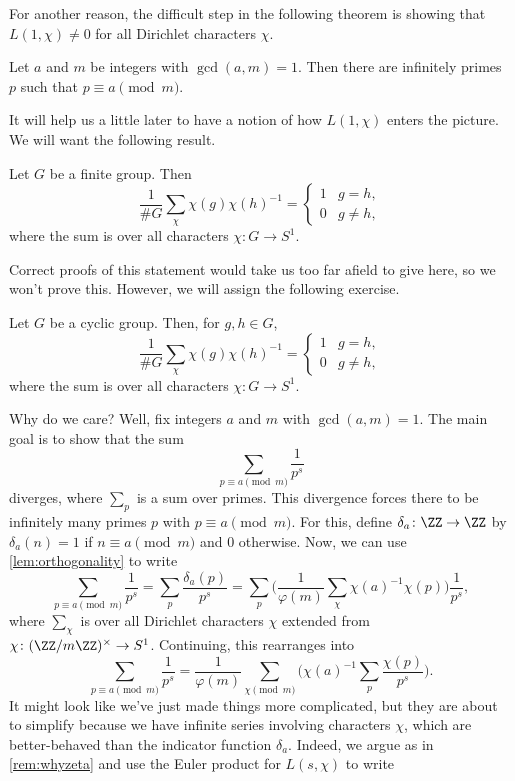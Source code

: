 \documentclass{article}
\begin{document}
For another reason, the difficult step in the following theorem is showing that $L(1,\chi)\ne0$ for all Dirichlet characters $\chi$.
\begin{theorem} \label{thm:dirichlet}
	Let $a$ and $m$ be integers with $\gcd(a,m)=1$. Then there are infinitely primes $p$ such that $p\equiv a\pmod m$.
\end{theorem}
It will help us a little later to have a notion of how $L(1,\chi)$ enters the picture. We will want the following result.
\begin{lemma} \label{lem:orthogonality}
	Let $G$ be a finite group. Then
	\[\frac1{\#G}\sum_\chi\chi(g)\chi(h)^{-1}=\begin{cases}
		1 & g=h, \\
		0 & g\ne h,
	\end{cases}\]
	where the sum is over all characters $\chi\colon G\to S^1$.
\end{lemma}
Correct proofs of this statement would take us too far afield to give here, so we won't prove this. However, we will assign the following exercise.
\begin{exe}
	Let $G$ be a cyclic group. Then, for $g,h\in G$,
	\[\frac1{\#G}\sum_\chi\chi(g)\chi(h)^{-1}=\begin{cases}
		1 & g=h, \\
		0 & g\ne h,
	\end{cases}\]
	where the sum is over all characters $\chi\colon G\to S^1$.
\end{exe}
Why do we care? Well, fix integers $a$ and $m$ with $\gcd(a,m)=1$. The main goal is to show that the sum
\[\sum_{p\equiv a\pmod m}\frac1{p^s}\]
diverges, where $\sum_p$ is a sum over primes. This divergence forces there to be infinitely many primes $p$ with $p\equiv a\pmod m$. For this, define $\delta_a\colon\ZZ\to\ZZ$ by $\delta_a(n)=1$ if $n\equiv a\pmod m$ and $0$ otherwise. Now, we can use \autoref{lem:orthogonality} to write
\[\sum_{p\equiv a\pmod m}\frac1{p^s}=\sum_p\frac{\delta_a(p)}{p^s}=\sum_p\Bigg(\frac1{\varphi(m)}\sum_\chi\chi(a)^{-1}\chi(p)\Bigg)\frac1{p^s},\]
where $\sum_\chi$ is over all Dirichlet characters $\chi$ extended from $\chi\colon(\ZZ/m\ZZ)^\times\to S^1$. Continuing, this rearranges into
\[\sum_{p\equiv a\pmod m}\frac1{p^s}=\frac1{\varphi(m)}\sum_{\chi\pmod m}\Bigg(\chi(a)^{-1}\sum_p\frac{\chi(p)}{p^s}\Bigg).\]
It might look like we've just made things more complicated, but they are about to simplify because we have infinite series involving characters $\chi$, which are better-behaved than the indicator function $\delta_a$. Indeed, we argue as in \autoref{rem:whyzeta} and use the Euler product for $L(s,\chi)$ to write
\end{document}
